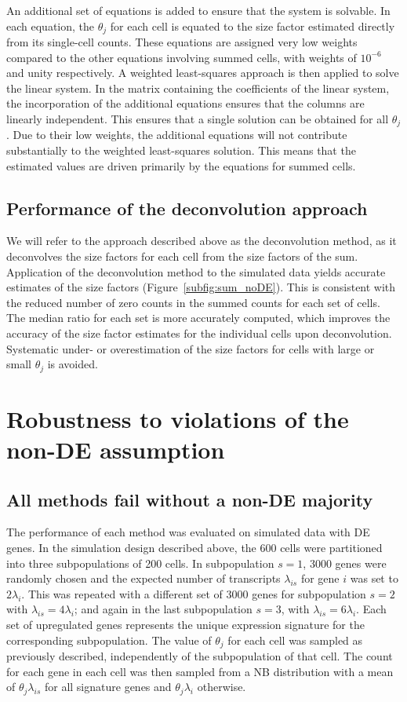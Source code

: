 \documentclass{article}
\begin{document}
An additional set of equations is added to ensure that the system is solvable.
In each equation, the $\theta_j$ for each cell is equated to the size factor estimated directly from its single-cell counts.
These equations are assigned very low weights compared to the other equations involving summed cells, with weights of $10^{-6}$ and unity respectively.
A weighted least-squares approach is then applied to solve the linear system.
In the matrix containing the coefficients of the linear system, the incorporation of the additional equations ensures that the columns are linearly independent.
This ensures that a single solution can be obtained for all $\theta_j$.
Due to their low weights, the additional equations will not contribute substantially to the weighted least-squares solution.
This means that the estimated values are driven primarily by the equations for summed cells.

\subsection{Performance of the deconvolution approach}
We will refer to the approach described above as the deconvolution method, as it deconvolves the size factors for each cell from the size factors of the sum.
Application of the deconvolution method to the simulated data yields accurate estimates of the size factors (Figure~\ref{subfig:sum_noDE}).
This is consistent with the reduced number of zero counts in the summed counts for each set of cells.
The median ratio for each set is more accurately computed, which improves the accuracy of the size factor estimates for the individual cells upon deconvolution.
Systematic under- or overestimation of the size factors for cells with large or small $\theta_j$ is avoided.

\section{Robustness to violations of the non-DE assumption}

\subsection{All methods fail without a non-DE majority}
The performance of each method was evaluated on simulated data with DE genes.
In the simulation design described above, the 600 cells were partitioned into three subpopulations of 200 cells.
In subpopulation $s=1$, 3000 genes were randomly chosen and the expected number of transcripts $\lambda_{is}$ for gene $i$ was set to $2\lambda_{i}$.
This was repeated with a different set of 3000 genes for subpopulation $s=2$ with $\lambda_{is}=4\lambda_i$; and again in the last subpopulation $s=3$, with $\lambda_{is}=6\lambda_i$.
Each set of upregulated genes represents the unique expression signature for the corresponding subpopulation.
The value of $\theta_j$ for each cell was sampled as previously described, independently of the subpopulation of that cell.
The count for each gene in each cell was then sampled from a NB distribution with a mean of $\theta_j\lambda_{is}$ for all signature genes and $\theta_j\lambda_i$ otherwise.
\end{document}
